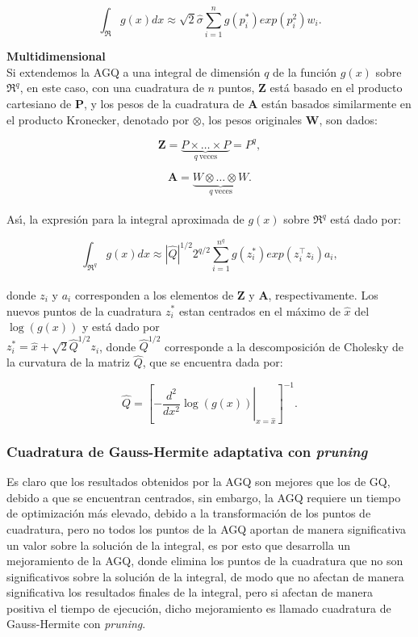 \[
\int_\Re{g(x)dx}\approx\sqrt{2}\hat{\sigma}\sum_{i=1}^{n}{g(p_i^*)exp(p_i^2)w_i.}
\]

\textbf{Multidimensional\\}
Si extendemos la AGQ a una integral de dimensi\'{o}n $q$ de la funci\'{o}n $g(x)$ sobre $\Re^q$, en este caso, con una cuadratura de $n$ puntos, $\textbf{Z}$ est\'{a} basado en el producto cartesiano de $\textbf{P}$, y los pesos de la cuadratura de $\textbf{A}$ est\'{a}n basados similarmente en el producto Kronecker, denotado por $\otimes$, los pesos originales $\textbf{W}$, son dados:

\[
\textbf{Z}=\underbrace{P \times \ldots \times P}_{q\ \text{veces}}=P^q,
\]

\[
\textbf{A}=\underbrace{W \otimes \ldots \otimes W}_{q\ \text{veces}}.
\]
\\
As\'{\i}, la expresi\'{o}n para la integral aproximada de $g(x)$ sobre $\Re^q$ est\'{a} dado por:

\[
\int_{\Re^q}{g(x)dx}\approx|\hat{Q}|^{1/2} 2^{q/2}\sum_{i=1}^{n^q}g(z_i^*)exp(z_i^{\top}z_i)a_i,
\]
\\
donde $z_i$ y $a_i$ corresponden a los elementos de $\textbf{Z}$ y $\textbf{A}$, respectivamente. Los nuevos puntos de la cuadratura $z_i^*$ estan centrados en el m\'{a}ximo de $\hat{x}$ del $\log(g(x))$ y est\'{a} dado por \\
$z_i^*=\hat{x}+\sqrt{2}\hat{Q}^{1/2}z_i$, donde $\hat{Q}^{1/2}$ corresponde a la descomposici\'{o}n de Cholesky de la curvatura de la matriz $\hat{Q}$, que se encuentra dada por:

\[
\hat{Q}={\left[\left. -\frac{d^2}{dx^2}\log(g(x))\right|_{x=\hat{x}}\right]^{-1}}.
\]

\subsubsection{Cuadratura de Gauss-Hermite adaptativa con \textit{pruning}}

Es claro que los resultados obtenidos por la AGQ son mejores que los de GQ, debido a que se encuentran centrados, sin embargo, la AGQ requiere un tiempo de optimizaci\'{o}n m\'{a}s elevado, debido a la transformaci\'{o}n de los puntos de cuadratura, pero no todos los puntos de la AGQ aportan de manera significativa un valor sobre la soluci\'{o}n de la integral, es por esto que \cite{Hernandez1} desarrolla un mejoramiento de la AGQ, donde elimina los puntos de la cuadratura que no son significativos sobre la soluci\'{o}n de la integral, de modo que no afectan de manera significativa los resultados finales de la integral, pero si afectan de manera positiva el tiempo de ejecuci\'{o}n, dicho mejoramiento es llamado cuadratura de Gauss-Hermite con \textit{pruning}.\\

